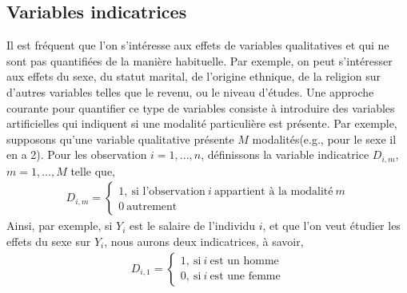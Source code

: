 \subsection{Variables indicatrices}
Il est fréquent que l'on s'intéresse aux effets de variables qualitatives et qui ne sont pas quantifiées de la manière habituelle. Par exemple, on peut s'intéresser aux effets du sexe, du statut marital, de l'origine ethnique, de la religion sur d'autres variables telles que le revenu, ou le niveau d'études. Une approche courante pour quantifier ce type de variables consiste à introduire des variables artificielles qui indiquent si une modalité particulière est présente. Par exemple, supposons qu'une variable qualitative présente $M$ modalités(e.g., pour le sexe il en a 2). Pour les observation $i=1,...,n$, définissons la variable indicatrice $D_{i,m}$, $m=1,...,M$ telle que,
\begin{align*}
D_{i, m} = \left\{
\begin{array}{c}
1, \  \textrm{si l'observation} \  i  \ \textrm{appartient à la  modalité} \ m\\
0 \  \textrm{autrement}
\end{array}
\right.
\end{align*}
Ainsi, par exemple, si $Y_i$ est le salaire de l'individu $i$, et que l'on veut étudier les effets du sexe sur $Y_i$, nous aurons deux indicatrices, à savoir,
\begin{align*}
D_{i, 1} = \left\{
\begin{array}{c}
1, \  \textrm{si} \  i  \ \textrm{est un homme}\\
0, \  \textrm{si} \  i  \ \textrm{est une femme}
\end{array}
\right.
\end{align*}

